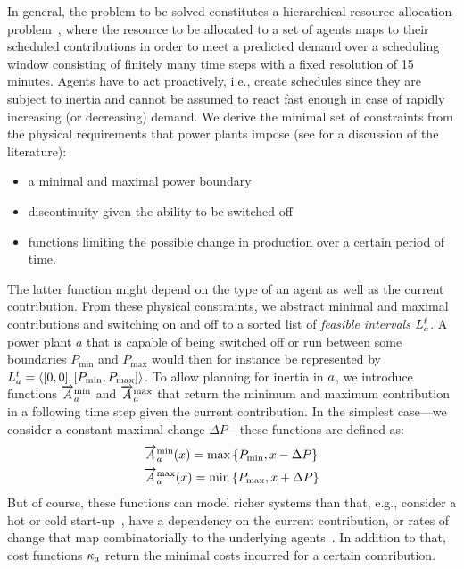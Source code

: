\documentclass[conference]{IEEEtran}
\begin{document}
In general, the problem to be solved constitutes a hierarchical resource allocation problem~\cite{VanZandt1995},
where the resource to be allocated to a set of agents maps to their scheduled contributions in order
to meet a predicted demand over a scheduling window consisting of finitely many time steps with a fixed resolution
of 15 minutes.
 Agents have to act proactively, i.e., create schedules since they
are subject to inertia and cannot be assumed to react fast enough in case of rapidly increasing (or decreasing) demand.
We derive the minimal set of constraints from the physical requirements that 
power plants impose (see \cite{SchiendorferSyn2014} for a discussion of the literature):
\begin{itemize}
\item a minimal and maximal power boundary
\item discontinuity given the ability to be switched off
\item functions limiting the possible change in production over a certain period of time.
\end{itemize}
The latter function
might depend on the type of an agent as well as the current contribution. 
From these physical constraints, we abstract minimal and maximal contributions
and switching on and off to a sorted list of \emph{feasible intervals} $L^{t}_{a}$.
A power plant $a$ that is capable of being switched off or run between some boundaries
$P_{\mathrm{min}}$ and $P_{\mathrm{max}}$ would then for instance be represented by 
$L^{t}_{a} = \langle [0,0], [P_{\mathrm{min}}, P_{\mathrm{max}}] \rangle$.
To allow planning for inertia in $a$, we introduce functions $\overrightarrow{A}^{\mathrm{min}}_{a}$ and
$\overrightarrow{A}^{\mathrm{max}}_{a}$ that return the minimum and maximum contribution in a following time step
given the current contribution. In the simplest case---we consider a constant maximal change $\Delta P$---these 
functions are defined as:
%
		\begin{align*}
		\label{eq:changeInContribution}
		&\ChangeSpeedMin\AnAgent(x) = \operatorname{max}\left\{P_{\mathrm{min}}, x - \Delta P\right\}\\
		&\ChangeSpeedMax\AnAgent(x) = \operatorname{min}\left\{P_{\mathrm{max}}, x + \Delta P\right\}
		\end{align*}
%
But of course, these functions can model richer systems than that, e.g., consider a hot or cold start-up~\cite{SchiendorferSyn2014},
have a dependency on the current contribution, or rates of change that map combinatorially to the underlying agents~\cite{Schiendorfer2014}. In addition to that,
cost functions $\kappa_{a}$ return the minimal costs incurred for a certain
contribution.
\end{document}
